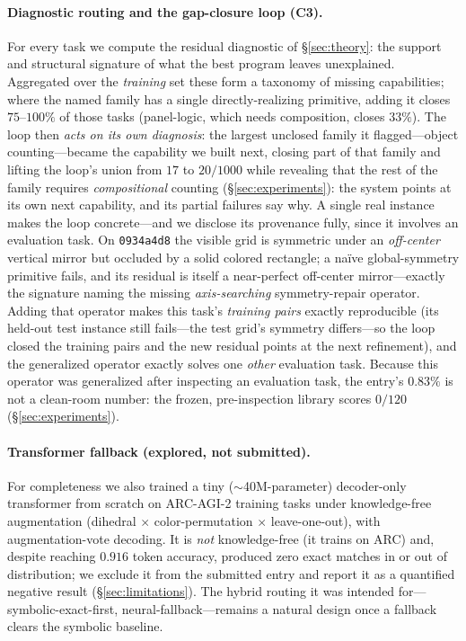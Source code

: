 \paragraph{Diagnostic routing and the gap-closure loop (C3).} For every task we compute the residual
diagnostic of \S\ref{sec:theory}: the support and structural signature of what the best program leaves
unexplained. Aggregated over the \emph{training} set these form a taxonomy of missing capabilities; where the
named family has a single directly-realizing primitive, adding it closes $75$--$100\%$ of those tasks
(panel-logic, which needs composition, closes $33\%$). The loop then \emph{acts on its own diagnosis}: the
largest unclosed family it flagged---object counting---became the capability we built next, closing part of
that family and lifting the loop's union from $17$ to $20/1000$ while revealing that the rest of the family
requires \emph{compositional} counting (\S\ref{sec:experiments}): the system points at its own next
capability, and its partial failures say why. A single real instance makes the loop concrete---and we disclose its provenance fully, since it involves an
evaluation task. On \texttt{0934a4d8} the visible grid is symmetric under an \emph{off-center} vertical mirror
but occluded by a solid colored rectangle; a na\"ive global-symmetry primitive fails, and its residual is
itself a near-perfect off-center mirror---exactly the signature naming the missing \emph{axis-searching}
symmetry-repair operator. Adding that operator makes this task's \emph{training pairs} exactly reproducible
(its held-out test instance still fails---the test grid's symmetry differs---so the loop closed the training
pairs and the new residual points at the next refinement), and the generalized operator exactly solves one
\emph{other} evaluation task. Because this operator was generalized after inspecting an evaluation task, the
entry's $0.83\%$ is not a clean-room number: the frozen, pre-inspection library scores $0/120$
(\S\ref{sec:experiments}).

\paragraph{Transformer fallback (explored, not submitted).} For completeness we also trained a tiny
($\sim$40M-parameter) decoder-only transformer from scratch on ARC-AGI-2 training tasks under knowledge-free
augmentation (dihedral $\times$ color-permutation $\times$ leave-one-out), with augmentation-vote decoding. It
is \emph{not} knowledge-free (it trains on ARC) and, despite reaching $0.916$ token accuracy, produced zero
exact matches in or out of distribution; we exclude it from the submitted entry and report it as a quantified
negative result (\S\ref{sec:limitations}). The hybrid routing it was intended for---symbolic-exact-first,
neural-fallback---remains a natural design once a fallback clears the symbolic baseline.
